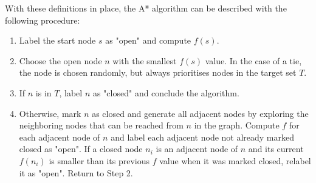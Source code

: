     With these definitions in place, the A* algorithm can be described with the following procedure:

    \begin{enumerate}
        \item Label the start node $s$ as "open" and compute $f(s)$.
        \item Choose the open node $n$ with the smallest $f(s)$ value. In the case of a tie, the node is chosen randomly, but always prioritises nodes in the target set $T$.
        \item If $n$ is in $T$, label $n$ as "closed" and conclude the algorithm.
        \item Otherwise, mark $n$ as closed and generate all adjacent nodes by exploring the neighboring nodes that can be reached from $n$ in the graph. Compute $f$ for each adjacent node of $n$ and label each adjacent node not already marked closed as "open". If a closed node $n_i$ is an adjacent node of $n$ and its current $f(n_{i})$ is smaller than its previous $f$ value when it was marked closed, relabel it as "open". Return to Step 2.
    \end{enumerate}